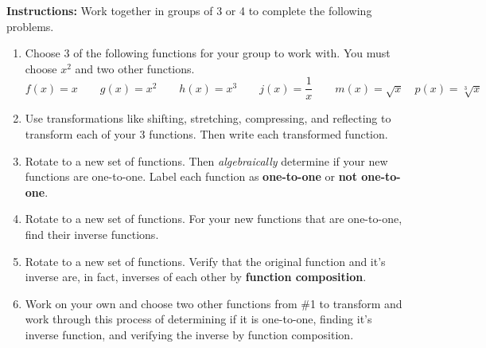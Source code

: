 

\noindent \textbf{Instructions:}  Work together in groups of  3 or 4 to complete the following problems.




\begin{enumerate}
\item Choose 3 of the following functions for your group to work with.  You must choose $x^2$ and two other functions.
$$f(x)=x \quad \quad g(x)=x^2 \quad \quad h(x)=x^3 \quad \quad j(x)=\frac{1}{x} \quad \quad m(x)=\sqrt{x}  \quad p(x)=\sqrt[3]{x}$$

\item Use transformations like shifting, stretching, compressing, and reflecting to transform each of your 3 functions.  Then write each transformed function.

\item Rotate to a new set of functions.  Then \emph{algebraically} determine if your new functions are one-to-one.  Label each function as \textbf{one-to-one} or \textbf{not one-to-one}.

\item Rotate to a new set of functions.  For your new functions that are one-to-one, find their inverse functions.  

\item Rotate to a new set of functions.  Verify that the original function and it's inverse are, in fact, inverses of each other by \textbf{function composition}.

\item Work on your own and choose two other functions from \#1 to transform and work through this process of determining if it is one-to-one, finding it's inverse function, and verifying the inverse by function composition.




\end{enumerate}




